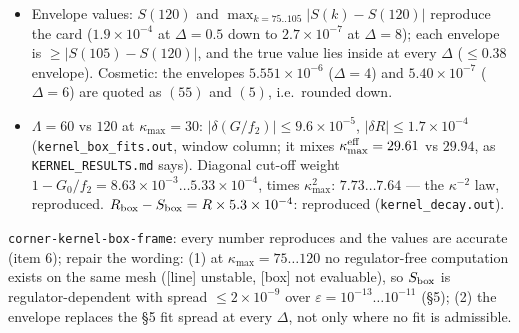 \documentclass[11pt]{article}
\begin{document}
\begin{itemize}[leftmargin=*]
It replaces \S5's ``spread across admissible fits'' at EVERY $\Delta$, but the card justifies it only at $\Delta=0.5$
(``no smooth fit \ldots admissible''); at $\Delta\ge1$ fits are admissible (\texttt{kernel\_box\_fits.out}) and at $\Delta=3$
their interval $0.2945479\pm1.95\times10^{-5}$ excludes the true $0.2945231$ (item 6), while the envelope contains it.
The deviation is justified by the data (oscillatory sharp cut-off) and must be stated for all $\Delta$. [MINOR]
\item Envelope values: $S(120)$ and $\max_{k=75..105}|S(k)-S(120)|$ reproduce the card ($1.9\times10^{-4}$ at
$\Delta=0.5$ down to $2.7\times10^{-7}$ at $\Delta=8$); each envelope is $\ge|S(105)-S(120)|$, and the true value lies inside
at every $\Delta$ ($\le0.38$ envelope). Cosmetic: the envelopes $5.551\times10^{-6}$ ($\Delta=4$) and $5.40\times10^{-7}$
($\Delta=6$) are quoted as $(55)$ and $(5)$, i.e.\ rounded down.
\item $\Lambda=60$ vs $120$ at $\kappa_{\max}=30$: $|\delta(G/f_2)|\le9.6\times10^{-5}$, $|\delta R|\le1.7\times10^{-4}$
(\texttt{kernel\_box\_fits.out}, window column; it mixes $\kappa_{\max}^{\rm eff}=29.61$ vs $29.94$, as
\texttt{KERNEL\_RESULTS.md} says). Diagonal cut-off weight $1-G_0/f_2=8.63\times10^{-3}\ldots5.33\times10^{-4}$, times
$\kappa_{\max}^2$: $7.73\ldots7.64$ --- the $\kappa^{-2}$ law, reproduced. $R_{\rm box}-S_{\rm box}=R\times5.3\times10^{-4}$:
reproduced (\texttt{kernel\_decay.out}).
\end{itemize}
\begin{verdictgap}
\texttt{corner-kernel-box-frame}: every number reproduces and the values are accurate (item 6); repair the wording:
(1) at $\kappa_{\max}=75\ldots120$ no regulator-free computation exists on the same mesh ([line] unstable, [box] not
evaluable), so $S_{\rm box}$ is regulator-dependent with spread $\le2\times10^{-9}$ over $\varepsilon=10^{-13}\ldots10^{-11}$
(\S5); (2) the envelope replaces the \S5 fit spread at every $\Delta$, not only where no fit is admissible.
\end{verdictgap}
\end{document}
